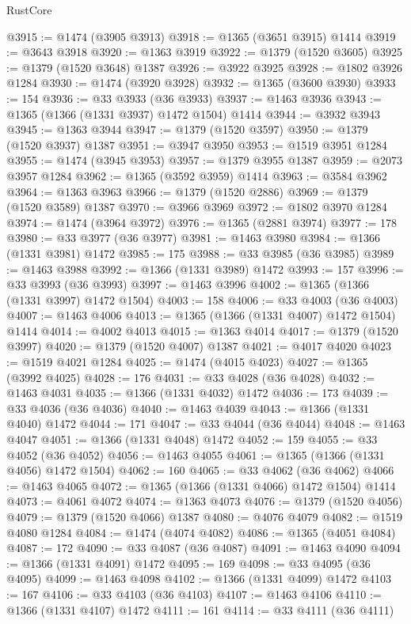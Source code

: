 \begin{lexlean}{RustCore}
\begin{coremodule}
@3915 := @1474 (@3905 @3913)
@3918 := @1365 (@3651 @3915) @1414
@3919 := @3643 @3918
@3920 := @1363 @3919
@3922 := @1379 (@1520 @3605)
@3925 := @1379 (@1520 @3648) @1387
@3926 := @3922 @3925
@3928 := @1802 @3926 @1284
@3930 := @1474 (@3920 @3928)
@3932 := @1365 (@3600 @3930)
@3933 := 154
@3936 := @33 @3933 (@36 @3933)
@3937 := @1463 @3936
@3943 := @1365 (@1366 (@1331 @3937) @1472 @1504) @1414
@3944 := @3932 @3943
@3945 := @1363 @3944
@3947 := @1379 (@1520 @3597)
@3950 := @1379 (@1520 @3937) @1387
@3951 := @3947 @3950
@3953 := @1519 @3951 @1284
@3955 := @1474 (@3945 @3953)
@3957 := @1379 @3955 @1387
@3959 := @2073 @3957 @1284
@3962 := @1365 (@3592 @3959) @1414
@3963 := @3584 @3962
@3964 := @1363 @3963
@3966 := @1379 (@1520 @2886)
@3969 := @1379 (@1520 @3589) @1387
@3970 := @3966 @3969
@3972 := @1802 @3970 @1284
@3974 := @1474 (@3964 @3972)
@3976 := @1365 (@2881 @3974)
@3977 := 178
@3980 := @33 @3977 (@36 @3977)
@3981 := @1463 @3980
@3984 := @1366 (@1331 @3981) @1472
@3985 := 175
@3988 := @33 @3985 (@36 @3985)
@3989 := @1463 @3988
@3992 := @1366 (@1331 @3989) @1472
@3993 := 157
@3996 := @33 @3993 (@36 @3993)
@3997 := @1463 @3996
@4002 := @1365 (@1366 (@1331 @3997) @1472 @1504)
@4003 := 158
@4006 := @33 @4003 (@36 @4003)
@4007 := @1463 @4006
@4013 := @1365 (@1366 (@1331 @4007) @1472 @1504) @1414
@4014 := @4002 @4013
@4015 := @1363 @4014
@4017 := @1379 (@1520 @3997)
@4020 := @1379 (@1520 @4007) @1387
@4021 := @4017 @4020
@4023 := @1519 @4021 @1284
@4025 := @1474 (@4015 @4023)
@4027 := @1365 (@3992 @4025)
@4028 := 176
@4031 := @33 @4028 (@36 @4028)
@4032 := @1463 @4031
@4035 := @1366 (@1331 @4032) @1472
@4036 := 173
@4039 := @33 @4036 (@36 @4036)
@4040 := @1463 @4039
@4043 := @1366 (@1331 @4040) @1472
@4044 := 171
@4047 := @33 @4044 (@36 @4044)
@4048 := @1463 @4047
@4051 := @1366 (@1331 @4048) @1472
@4052 := 159
@4055 := @33 @4052 (@36 @4052)
@4056 := @1463 @4055
@4061 := @1365 (@1366 (@1331 @4056) @1472 @1504)
@4062 := 160
@4065 := @33 @4062 (@36 @4062)
@4066 := @1463 @4065
@4072 := @1365 (@1366 (@1331 @4066) @1472 @1504) @1414
@4073 := @4061 @4072
@4074 := @1363 @4073
@4076 := @1379 (@1520 @4056)
@4079 := @1379 (@1520 @4066) @1387
@4080 := @4076 @4079
@4082 := @1519 @4080 @1284
@4084 := @1474 (@4074 @4082)
@4086 := @1365 (@4051 @4084)
@4087 := 172
@4090 := @33 @4087 (@36 @4087)
@4091 := @1463 @4090
@4094 := @1366 (@1331 @4091) @1472
@4095 := 169
@4098 := @33 @4095 (@36 @4095)
@4099 := @1463 @4098
@4102 := @1366 (@1331 @4099) @1472
@4103 := 167
@4106 := @33 @4103 (@36 @4103)
@4107 := @1463 @4106
@4110 := @1366 (@1331 @4107) @1472
@4111 := 161
@4114 := @33 @4111 (@36 @4111)

\end{coremodule}
\end{lexlean}
